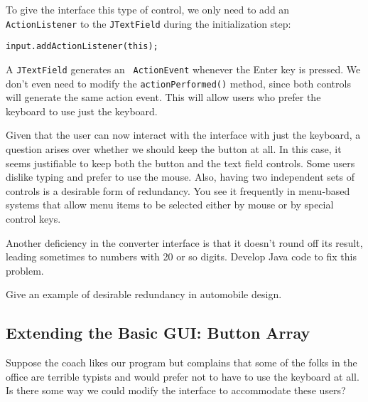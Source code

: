 To give the interface this type of control, we only need to add an
{\tt ActionLis\-tener} to the {\tt JTextField} during the initialization
step:

\begin{jjjlisting}
\begin{lstlisting}
input.addActionListener(this);
\end{lstlisting}
\end{jjjlisting}

\noindent A {\tt JTextField} generates an {\tt
ActionEvent} whenever the Enter key is pressed.  We don't even need to
modify the {\tt actionPerformed()} method, since both controls will
generate the same action event.  This will allow users who prefer the
keyboard to use just the keyboard.


\noindent Given that the user can now interact with the
interface with just the keyboard, a question arises over whether we
should keep the button at all.  In this case, it seems justifiable to
keep both the button and the text field controls.  Some users dislike
typing and prefer to use the mouse.  Also, having two independent sets
of controls is a desirable form of redundancy.  You see it frequently
in menu-based systems that allow menu items to be selected either by
mouse or by special control keys.


\label{self-study-exercises}
\begin{SSTUDY}

\item  Another deficiency in the converter interface is that it doesn't round
off its result, leading sometimes to numbers with 20 or so
digits.  Develop Java code to fix this problem.


\item  Give an example of desirable redundancy in automobile design.

\end{SSTUDY}

\subsection{Extending the Basic GUI: Button Array}
\label{sec-keypad}
\noindent Suppose the coach likes our program but complains that some of the
folks in the office are terrible typists and would prefer not to have
to use the keyboard at all.  Is there some way we could modify the
interface to accommodate these users?



